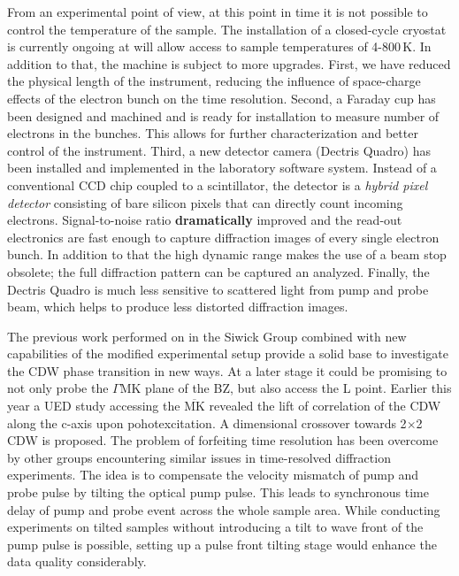 From an experimental point of view, at this point in time it is not possible to control the temperature of the sample.
The installation of a closed-cycle cryostat is currently ongoing at will allow access to sample temperatures of 4-800\,K.
In addition to that, the machine is subject to more upgrades.
First, we have reduced the physical length of the instrument, reducing the influence of space-charge effects of the electron bunch on the time resolution.
Second, a Faraday cup has been designed and machined and is ready for installation to measure number of electrons in the bunches.
This allows for further characterization and better control of the instrument.
Third, a new detector camera (Dectris Quadro) has been installed and implemented in the laboratory software system.
Instead of a conventional CCD chip coupled to a scintillator, the detector is a \emph{hybrid pixel detector} consisting of bare silicon pixels that can directly count incoming electrons.
Signal-to-noise ratio \textbf{dramatically} improved and the read-out electronics are fast enough to capture diffraction images of every single electron bunch.
In addition to that the high dynamic range makes the use of a beam stop obsolete; the full diffraction pattern can be captured an analyzed.
Finally, the Dectris Quadro is much less sensitive to scattered light from pump and probe beam, which helps to produce less distorted diffraction images.

The previous work performed on \ts\space in the Siwick Group combined with new capabilities of the modified experimental setup provide a solid base to investigate the \ac{CDW} phase transition in new ways.
At a later stage it could be promising to not only probe the $\Gamma\mathrm{MK}$ plane of the \ac{BZ}, but also access the L point.
Earlier this year a \ac{UED} study accessing the $\overline{\mathrm{MK}}$ revealed the lift of correlation of the \ac{CDW} along the c-axis upon pohotexcitation.
A dimensional crossover towards 2$\times$2 \ac{CDW} is proposed\cite{cheng2022}.
The problem of forfeiting time resolution has been overcome by other groups encountering similar issues in time-resolved diffraction experiments.
The idea is to compensate the velocity mismatch of pump and probe pulse by tilting the optical pump pulse.
This leads to synchronous time delay of pump and probe event across the whole sample area\cite{baum2006,zhou2013}.
While conducting experiments on tilted samples without introducing a tilt to wave front of the pump pulse is possible, setting up a pulse front tilting stage would enhance the data quality considerably.

